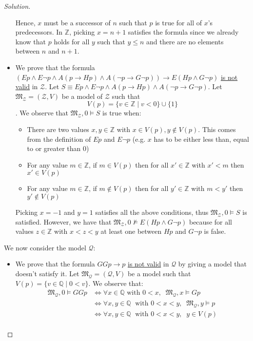 \documentclass[12pt,a4paper]{report}
\theoremstyle{definition}
\newcommand{\Z}{\mathbb{Z}}                     %
\newcommand{\Q}{\mathbb{Q}}                     %
\newcommand{\model}[1]{\mathfrak{#1}}           %
\begin{document}
\begin{proof}[Solution]
\begin{itemize}
            Hence, $x$ must be a successor of $n$ such that $p$ is true for all of $x$'s predecessors. In $\Z$, picking $x = n+1$ satisfies the formula since we already know that $p$ holds for all $y$ such that $y \leq n$ and there are no elements between $n$ and $n+1$.

            \item We prove that the formula $(Ep \land E \lnot p \land A(p \to Hp) \land A(\lnot p \to G \lnot p)) \to E(Hp \land G \lnot p)$ \underline{is not valid} in $\mathcal{Z}$. Let $S \equiv Ep \land E \lnot p \land A(p \to Hp) \land A(\lnot p \to G \lnot p)$. Let $\model{M}_{\mathcal{Z}} = (\mathcal{Z}, V)$ be a model of $\mathcal{Z}$ such that
            \[V(p) = \{v \in \Z \mid v < 0\} \cup \{1\}\]. We observe that $\model{M}_{\mathcal{Z}}, 0 \models S$ is true when:
            \begin{itemize}
                \item There are two values $x,y \in \Z$ with $x \in V(p), y \notin V(p)$. This comes from the definition of $E p$ and $E \lnot p$ (e.g. $x$ has to be either less than, equal to or greater than $0$)
                \item For any value $m \in \Z$, if $m \in V(p)$ then for all $x' \in \Z$ with $x' < m$ then $x' \in V(p)$
                \item For any value $m \in \Z$, if $m \notin V(p)$ then for all $y' \in \Z$ with $m < y'$ then $y' \notin V(p)$
            \end{itemize}

            Picking $x = -1$ and $y = 1$ satisfies all the above conditions, thus $\model{M}_{\mathcal{Z}}, 0 \models S$ is satisfied. However, we have that $\model{M}_{\mathcal{Z}}, 0 \not\models E(Hp \land G \lnot p)$ because for all values $z \in \Z$ with $x < z < y$ at least one between $Hp$ and $G \lnot p$ is false.
        \end{itemize}

        We now consider the model $\mathcal{Q}$:
        \begin{itemize}
            \item We prove that the formula $GGp \to p$ \underline{is not valid} in $\mathcal{Q}$ by giving a model that doesn't satisfy it. Let $\model{M}_{\mathcal{Q}} = (\mathcal{Q}, V)$ be a model such that $V(p) = \{v \in \Q \mid 0 < v\}$. We observe that:
            \[\begin{split}
                \model{M}_{\mathcal{Q}}, 0 \models GGp & \iff \forall x \in \Q \text{ with } 0 < x, \;\; \model{M}_{\mathcal{Q}}, x \models Gp \\
                & \iff \forall x,y  \in \Q \; \text{ with } 0 < x < y, \;\; \model{M}_{\mathcal{Q}}, y \models p \\ 
                & \iff \forall x,y \in \Q \; \text{ with } 0 < x < y, \;\; y \in V(p) \\ 
            \end{split}\]


\end{itemize}
\end{proof}
\end{document}
